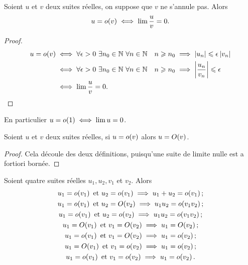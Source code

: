 \begin{prop}
  Soient \(u\) et \(v\) deux suites réelles, on suppose que \(v\) ne s'annule pas. Alors
  \begin{equation}
    u=o\mathopen{}\left(v\right) \iff \lim \frac{u}{v}=0.
  \end{equation}
\end{prop}
\begin{proof}
  \begin{align}
    u=o\mathopen{}\left(v\right) & \iff \forall \epsilon > 0 \ \exists n_0 \in \mathbb{N} \ \forall n \in \mathbb{N} \quad n \geqslant n_0 \implies \left\lvert u_n\right\rvert \leqslant \epsilon \left\lvert v_n\right\rvert \\
    & \iff \forall \epsilon > 0 \ \exists n_0 \in \mathbb{N} \ \forall n \in \mathbb{N} \quad n \geqslant n_0 \implies \left\lvert\frac{u_n}{v_n}\right\rvert \leqslant \epsilon \\
    & \iff \lim \frac{u}{v} =0.
  \end{align}
\end{proof}
En particulier \(u=o\mathopen{}\left(1\right) \iff \lim u =0\).
\begin{prop}
  Soient \(u\) et \(v\) deux suites réelles, si \(u=o\mathopen{}\left(v\right)\) alors \(u=O\mathopen{}\left(v\right)\).
\end{prop}
\begin{proof}
  Cela découle des deux définitions, puisqu'une suite de limite nulle est a fortiori bornée.
\end{proof}
\begin{prop}
  Soient quatre suites réelles \(u_1, u_2, v_1\) et \(v_2\). Alors
  \begin{gather}
    u_1=o\mathopen{}\left(v_1\right)\text{~et~}u_2=o\mathopen{}\left(v_1\right)\implies u_1+u_2=o\mathopen{}\left(v_1\right);\\
    u_1=o\mathopen{}\left(v_1\right)\text{~et~}u_2=O\mathopen{}\left(v_2\right)\implies u_1u_2=o\mathopen{}\left(v_1 v_2\right);\\
    u_1=o\mathopen{}\left(v_1\right)\text{~et~}u_2=o\mathopen{}\left(v_2\right)\implies u_1u_2=o\mathopen{}\left(v_1 v_2\right);\\
    u_1=O\mathopen{}\left(v_1\right)\text{~et~}v_1=O\mathopen{}\left(v_2\right)\implies u_1=O\mathopen{}\left(v_2\right);\\
    u_1=o\mathopen{}\left(v_1\right)\text{~et~}v_1=O\mathopen{}\left(v_2\right)\implies u_1=o\mathopen{}\left(v_2\right);\\
    u_1=O\mathopen{}\left(v_1\right)\text{~et~}v_1=o\mathopen{}\left(v_2\right)\implies u_1=o\mathopen{}\left(v_2\right);\\
    u_1=o\mathopen{}\left(v_1\right)\text{~et~}v_1=o\mathopen{}\left(v_2\right)\implies u_1=o\mathopen{}\left(v_2\right).
  \end{gather}
\end{prop}
